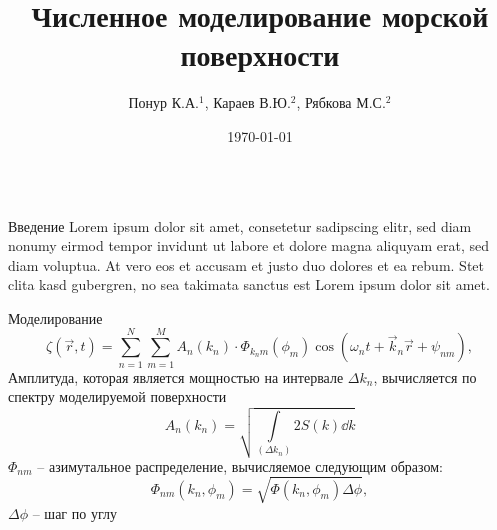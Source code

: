 
\title{Численное моделирование морской поверхности}
\author{Понур К.А.$^{1}$, Караев В.Ю.$^2$, Рябкова М.С.$^2$}
\date{\today}
\newcommand{\tM}{\widetilde{M}}
\usepackage{mathtools}

  \begin{frame}[t]{} 
    \begin{columns}[t]
      \begin{column}{.48\linewidth}
        \begin{block}{Введение}
            Lorem ipsum dolor sit amet, consetetur sadipscing elitr, sed diam nonumy eirmod
            tempor invidunt ut labore et dolore magna aliquyam erat, sed diam voluptua. At
            vero eos et accusam et justo duo dolores et ea rebum. Stet clita kasd gubergren,
            no sea takimata sanctus est Lorem ipsum dolor sit amet.
        \end{block}
        \begin{block}{Моделирование}
        \begin{equation}
            \zeta(\vec r, t)= \sum\limits_{n=1}^N \sum_{m=1}^M A_n(k_n)\cdot 
            \Phi_{k_nm}(\phi_m) \cos(\omega_n t + \vec k_n \vec r + \psi_{nm}),
        \end{equation}
        Амплитуда, которая является мощностью на интервале $\Delta k_n$, вычисляется по спектру моделируемой поверхности
        \begin{equation}
            A_n(k_n)=\sqrt{ \int\limits_{(\Delta k_n)}  2 S(k) \dd{k}}
        \end{equation}
        $\Phi_{nm}$ -- азимутальное распределение, вычисляемое следующим образом:
        \begin{equation}
        \Phi_{nm}(k_n,\phi_m)=\sqrt{\Phi(k_n,\phi_m) \Delta \phi},
        \end{equation}
        $\Delta \phi$ -- шаг по углу
        

\end{block}
\end{column}
\end{columns}
\end{frame}

